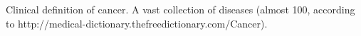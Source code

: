 \documentclass{tufte-book}
\begin{document}








\bigskip

Clinical definition of cancer. A vast collection of diseases (almost 100,
according to http://medical-dictionary.thefreedictionary.com/Cancer).

\backmatter



\end{document}
